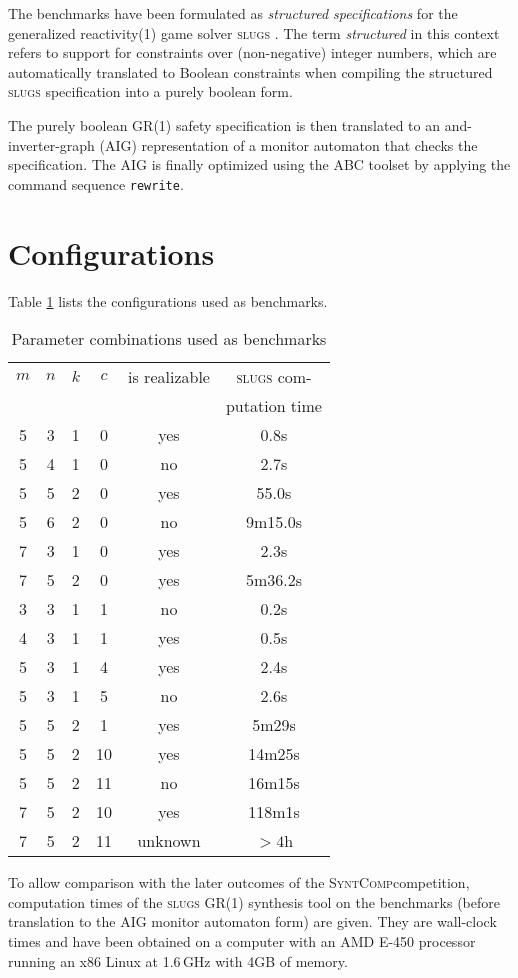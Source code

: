 \documentclass[a4paper,10pt]{IEEEtran}
\newcommand{\SyntComp}{\textsc{SyntComp}}
\begin{document}
\noindent The benchmarks have been formulated as \emph{structured specifications} for the generalized reactivity(1) game solver \textsc{slugs} \cite{SlugsReference}. The term \emph{structured} in this context refers to support for constraints over (non-negative) integer numbers, which are automatically translated to Boolean constraints when compiling the structured \textsc{slugs} specification into a purely boolean form.

The purely boolean GR(1) safety specification is then translated to an and-inverter-graph (AIG) representation of a monitor automaton that checks the specification. The AIG is finally optimized using the ABC toolset \cite{ABCTool} by applying the command sequence \texttt{rewrite}.


\section{Configurations}

\noindent Table \ref{tab:benchmarks} lists the configurations used as benchmarks.
%
\begin{table}[b]
\normalsize
\begin{center}
\begin{tabular}{c|c|c|c||c|c}
$m$ & $n$ & $k$ & $c$ & is realizable & \textsc{slugs} com- \\ & & & & & putation time\\ \hline \hline
5 & 3 & 1 & 0 & yes & 0.8s \\ \hline
5 & 4 & 1 & 0 & no & 2.7s \\ \hline
5 & 5 & 2 & 0 & yes & 55.0s \\ \hline
5 & 6 & 2 & 0 & no & 9m15.0s \\ \hline 
7 & 3 & 1 & 0 & yes & 2.3s \\ \hline 
7 & 5 & 2 & 0 & yes & 5m36.2s \\ \hline 
\hline
3 & 3 & 1 & 1 & no & 0.2s \\ \hline
4 & 3 & 1 & 1 & yes & 0.5s \\ \hline
5 & 3 & 1 & 4 & yes & 2.4s \\ \hline
5 & 3 & 1 & 5 & no & 2.6s \\ \hline
5 & 5 & 2 & 1 & yes & 5m29s \\ \hline
5 & 5 & 2 & 10 & yes & 14m25s \\ \hline
5 & 5 & 2 & 11 & no & 16m15s \\ \hline
7 & 5 & 2 & 10 & yes & 118m1s \\ \hline 
7 & 5 & 2 & 11 & unknown & $>4$h \\ \hline 
\end{tabular}
\end{center}
\caption{Parameter combinations used as benchmarks}
\label{tab:benchmarks}
\end{table}
%
To allow comparison with the later outcomes of the \SyntComp competition, computation times of the \textsc{slugs} GR(1) synthesis tool on the benchmarks (before translation to the AIG monitor automaton form) are given. They are wall-clock times and have been obtained on a computer with an AMD E-450 processor running an x86 Linux at 1.6\,GHz with 4GB of memory.
\end{document}
